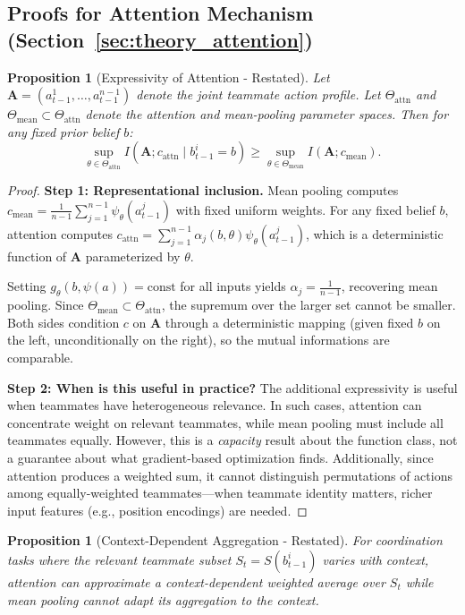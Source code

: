\documentclass{article}
\theoremstyle{plain}
\newtheorem{proposition}[theorem]{Proposition}
\theoremstyle{definition}
\theoremstyle{remark}
\begin{document}
\subsection{Proofs for Attention Mechanism (Section~\ref{sec:theory_attention})}
\label{app:proofs}

\begin{proposition}[Expressivity of Attention - Restated]
Let $\mathbf{A} = (a_{t-1}^1, \ldots, a_{t-1}^{n-1})$ denote the joint teammate action profile. Let $\Theta_{\mathrm{attn}}$ and $\Theta_{\mathrm{mean}} \subset \Theta_{\mathrm{attn}}$ denote the attention and mean-pooling parameter spaces. Then for any fixed prior belief $b$:
\[
\sup_{\theta \in \Theta_{\mathrm{attn}}} I(\mathbf{A}; c_{\mathrm{attn}} \mid b_{t-1}^i = b) \geq \sup_{\theta \in \Theta_{\mathrm{mean}}} I(\mathbf{A}; c_{\mathrm{mean}}).
\]
\end{proposition}

\begin{proof}
\textbf{Step 1: Representational inclusion.}
Mean pooling computes $c_{\mathrm{mean}} = \frac{1}{n-1}\sum_{j=1}^{n-1} \psi_\theta(a_{t-1}^j)$ with fixed uniform weights.
For any fixed belief $b$, attention computes $c_{\mathrm{attn}} = \sum_{j=1}^{n-1} \alpha_j(b, \theta) \psi_\theta(a_{t-1}^j)$, which is a deterministic function of $\mathbf{A}$ parameterized by $\theta$.

Setting $g_\theta(b, \psi(a)) = \text{const}$ for all inputs yields $\alpha_j = \frac{1}{n-1}$, recovering mean pooling. Since $\Theta_{\mathrm{mean}} \subset \Theta_{\mathrm{attn}}$, the supremum over the larger set cannot be smaller. Both sides condition $c$ on $\mathbf{A}$ through a deterministic mapping (given fixed $b$ on the left, unconditionally on the right), so the mutual informations are comparable.

\textbf{Step 2: When is this useful in practice?}
The additional expressivity is useful when teammates have heterogeneous relevance. In such cases, attention can concentrate weight on relevant teammates, while mean pooling must include all teammates equally. However, this is a \emph{capacity} result about the function class, not a guarantee about what gradient-based optimization finds. Additionally, since attention produces a weighted sum, it cannot distinguish permutations of actions among equally-weighted teammates---when teammate identity matters, richer input features (e.g., position encodings) are needed.
\end{proof}

\begin{proposition}[Context-Dependent Aggregation - Restated]
For coordination tasks where the relevant teammate subset $S_t = S(b_{t-1}^i)$ varies with context, attention can approximate a context-dependent weighted average over $S_t$ while mean pooling cannot adapt its aggregation to the context.
\end{proposition}
\end{document}
